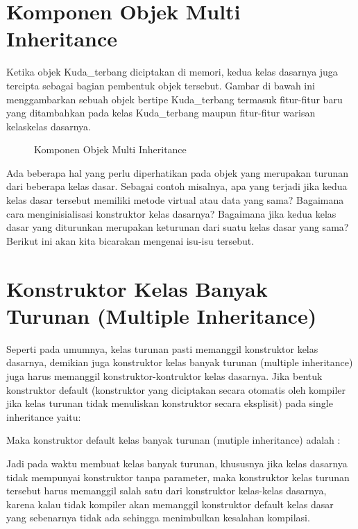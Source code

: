 \section{Komponen Objek Multi Inheritance}\label{komponen-objek-multi-inheritance}

Ketika objek Kuda\_terbang diciptakan di memori, kedua kelas dasarnya
juga tercipta sebagai bagian pembentuk objek tersebut. Gambar di bawah
ini menggambarkan sebuah objek bertipe Kuda\_terbang termasuk
fitur-fitur baru yang ditambahkan pada kelas Kuda\_terbang maupun
fitur-fitur warisan kelaskelas dasarnya.

\begin{figure}[htbp]
\centering
{}
\caption{Komponen Objek Multi Inheritance}
\end{figure}

Ada beberapa hal yang perlu diperhatikan pada objek yang merupakan
turunan dari beberapa kelas dasar. Sebagai contoh misalnya, apa yang
terjadi jika kedua kelas dasar tersebut memiliki metode virtual atau
data yang sama? Bagaimana cara menginisialisasi konstruktor kelas
dasarnya? Bagaimana jika kedua kelas dasar yang diturunkan merupakan
keturunan dari suatu kelas dasar yang sama? Berikut ini akan kita
bicarakan mengenai isu-isu tersebut.

\section{Konstruktor Kelas Banyak Turunan (Multiple Inheritance)}\label{konstruktor-kelas-banyak-turunan-multiple-inheritance}

Seperti pada umumnya, kelas turunan pasti memanggil konstruktor kelas
dasarnya, demikian juga konstruktor kelas banyak turunan (multiple
inheritance) juga harus memanggil konstruktor-kontruktor kelas dasarnya.
Jika bentuk konstruktor default (konstruktor yang diciptakan secara
otomatis oleh kompiler jika kelas turunan tidak menuliskan konstruktor
secara eksplisit) pada single inheritance yaitu:



Maka konstruktor default kelas banyak turunan (mutiple inheritance)
adalah :



Jadi pada waktu membuat kelas banyak turunan, khususnya jika kelas
dasarnya tidak mempunyai konstruktor tanpa parameter, maka konstruktor
kelas turunan tersebut harus memanggil salah satu dari konstruktor
kelas-kelas dasarnya, karena kalau tidak kompiler akan memanggil
konstruktor default kelas dasar yang sebenarnya tidak ada sehingga
menimbulkan kesalahan kompilasi.

